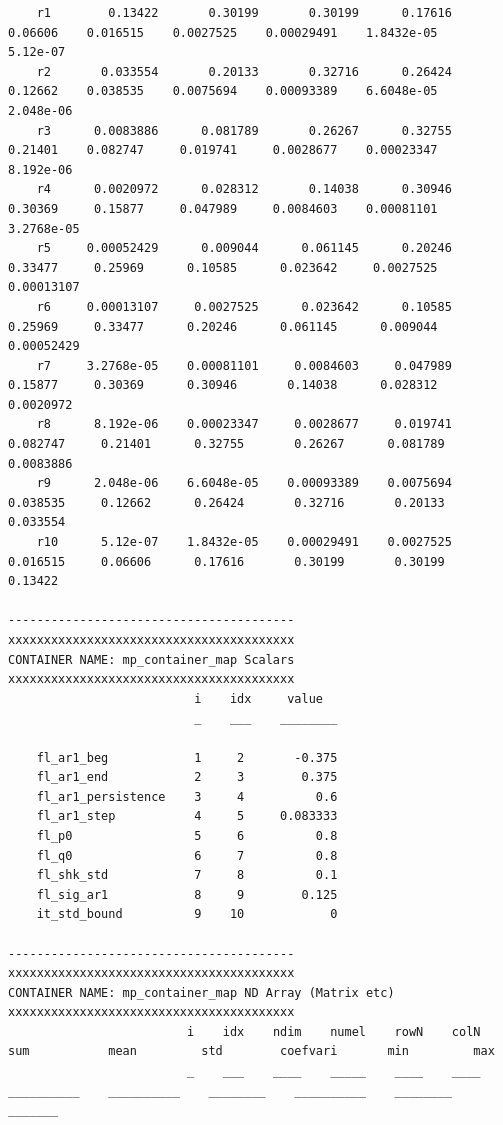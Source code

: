 \documentclass[
]{book}
\begin{document}
\begin{verbatim}
    r1        0.13422       0.30199       0.30199      0.17616     0.06606    0.016515    0.0027525    0.00029491    1.8432e-05      5.12e-07
    r2       0.033554       0.20133       0.32716      0.26424     0.12662    0.038535    0.0075694    0.00093389    6.6048e-05     2.048e-06
    r3      0.0083886      0.081789       0.26267      0.32755     0.21401    0.082747     0.019741     0.0028677    0.00023347     8.192e-06
    r4      0.0020972      0.028312       0.14038      0.30946     0.30369     0.15877     0.047989     0.0084603    0.00081101    3.2768e-05
    r5     0.00052429      0.009044      0.061145      0.20246     0.33477     0.25969      0.10585      0.023642     0.0027525    0.00013107
    r6     0.00013107     0.0027525      0.023642      0.10585     0.25969     0.33477      0.20246      0.061145      0.009044    0.00052429
    r7     3.2768e-05    0.00081101     0.0084603     0.047989     0.15877     0.30369      0.30946       0.14038      0.028312     0.0020972
    r8      8.192e-06    0.00023347     0.0028677     0.019741    0.082747     0.21401      0.32755       0.26267      0.081789     0.0083886
    r9      2.048e-06    6.6048e-05    0.00093389    0.0075694    0.038535     0.12662      0.26424       0.32716       0.20133      0.033554
    r10      5.12e-07    1.8432e-05    0.00029491    0.0027525    0.016515     0.06606      0.17616       0.30199       0.30199       0.13422

----------------------------------------
xxxxxxxxxxxxxxxxxxxxxxxxxxxxxxxxxxxxxxxx
CONTAINER NAME: mp_container_map Scalars
xxxxxxxxxxxxxxxxxxxxxxxxxxxxxxxxxxxxxxxx
                          i    idx     value  
                          _    ___    ________

    fl_ar1_beg            1     2       -0.375
    fl_ar1_end            2     3        0.375
    fl_ar1_persistence    3     4          0.6
    fl_ar1_step           4     5     0.083333
    fl_p0                 5     6          0.8
    fl_q0                 6     7          0.8
    fl_shk_std            7     8          0.1
    fl_sig_ar1            8     9        0.125
    it_std_bound          9    10            0

----------------------------------------
xxxxxxxxxxxxxxxxxxxxxxxxxxxxxxxxxxxxxxxx
CONTAINER NAME: mp_container_map ND Array (Matrix etc)
xxxxxxxxxxxxxxxxxxxxxxxxxxxxxxxxxxxxxxxx
                         i    idx    ndim    numel    rowN    colN       sum           mean         std        coefvari       min         max  
                         _    ___    ____    _____    ____    ____    __________    __________    ________    __________    ________    _______


\end{verbatim}
\end{document}
